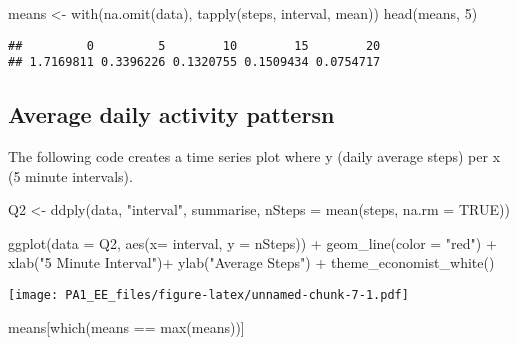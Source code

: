 \documentclass[
]{article}
\newenvironment{Shaded}{\begin{snugshade}}{\end{snugshade}}
\newcommand{\AttributeTok}[1]{\textcolor[rgb]{0.77,0.63,0.00}{#1}}
\newcommand{\ConstantTok}[1]{\textcolor[rgb]{0.00,0.00,0.00}{#1}}
\newcommand{\DecValTok}[1]{\textcolor[rgb]{0.00,0.00,0.81}{#1}}
\newcommand{\FunctionTok}[1]{\textcolor[rgb]{0.00,0.00,0.00}{#1}}
\newcommand{\NormalTok}[1]{#1}
\newcommand{\OtherTok}[1]{\textcolor[rgb]{0.56,0.35,0.01}{#1}}
\newcommand{\SpecialCharTok}[1]{\textcolor[rgb]{0.00,0.00,0.00}{#1}}
\newcommand{\StringTok}[1]{\textcolor[rgb]{0.31,0.60,0.02}{#1}}
\begin{document}
\begin{Shaded}
\begin{Highlighting}[]
\NormalTok{means }\OtherTok{\textless{}{-}} \FunctionTok{with}\NormalTok{(}\FunctionTok{na.omit}\NormalTok{(data), }\FunctionTok{tapply}\NormalTok{(steps, interval, mean))}
\FunctionTok{head}\NormalTok{(means, }\DecValTok{5}\NormalTok{)}
\end{Highlighting}
\end{Shaded}

\begin{verbatim}
##         0         5        10        15        20 
## 1.7169811 0.3396226 0.1320755 0.1509434 0.0754717
\end{verbatim}

\hypertarget{average-daily-activity-pattersn}{%
\subsection{Average daily activity
pattersn}\label{average-daily-activity-pattersn}}

The following code creates a time series plot where y (daily average
steps) per x (5 minute intervals).

\begin{Shaded}
\begin{Highlighting}[]
\NormalTok{Q2 }\OtherTok{\textless{}{-}} \FunctionTok{ddply}\NormalTok{(data, }\StringTok{"interval"}\NormalTok{, summarise,}
            \AttributeTok{nSteps =} \FunctionTok{mean}\NormalTok{(steps, }\AttributeTok{na.rm =} \ConstantTok{TRUE}\NormalTok{))}

\FunctionTok{ggplot}\NormalTok{(}\AttributeTok{data =}\NormalTok{ Q2, }\FunctionTok{aes}\NormalTok{(}\AttributeTok{x=}\NormalTok{ interval, }\AttributeTok{y =}\NormalTok{ nSteps)) }\SpecialCharTok{+}
  \FunctionTok{geom\_line}\NormalTok{(}\AttributeTok{color =} \StringTok{"red"}\NormalTok{) }\SpecialCharTok{+}
  \FunctionTok{xlab}\NormalTok{(}\StringTok{"5 Minute Interval"}\NormalTok{)}\SpecialCharTok{+}
  \FunctionTok{ylab}\NormalTok{(}\StringTok{"Average Steps"}\NormalTok{) }\SpecialCharTok{+}
  \FunctionTok{theme\_economist\_white}\NormalTok{()}
\end{Highlighting}
\end{Shaded}

\texttt{[image: PA1\_EE\_files/figure-latex/unnamed-chunk-7-1.pdf]}

\begin{Shaded}
\begin{Highlighting}[]
\NormalTok{means[}\FunctionTok{which}\NormalTok{(means }\SpecialCharTok{==} \FunctionTok{max}\NormalTok{(means))]}
\end{Highlighting}
\end{Shaded}
\end{document}
